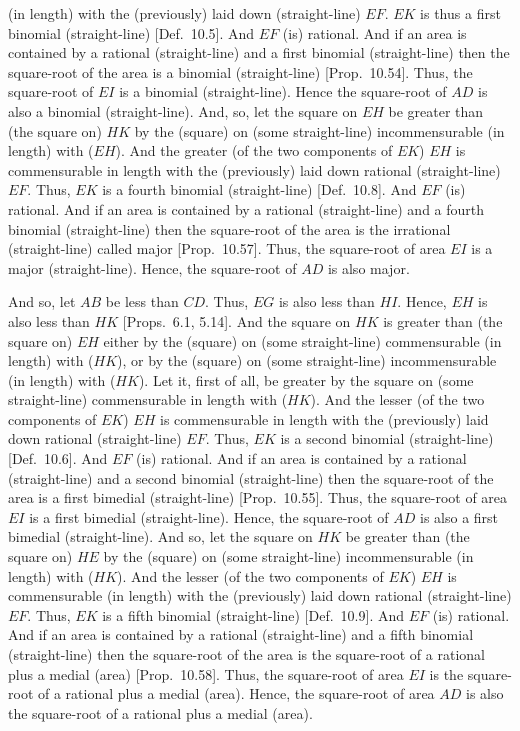 \begin{Parallel}{}{}
{(in length) with the (previously) laid down (straight-line) $EF$. $EK$ is thus a first binomial
(straight-line) [Def.~10.5]. And $EF$ (is) rational. And if an area is contained by a rational (straight-line) and a first
binomial (straight-line) then the square-root  of the  area is a binomial
(straight-line)  [Prop.~10.54]. Thus,
the square-root of $EI$ is a binomial (straight-line). Hence the square-root of $AD$ is also a binomial (straight-line).  And, so, let the
 square on $EH$ be greater than (the square on) $HK$ by the (square) on 
 (some straight-line) incommensurable (in length) with ($EH$). And the
 greater (of the two components of $EK$) $EH$ is commensurable in length with the (previously)
 laid down rational (straight-line) $EF$. Thus, $EK$ is a fourth
 binomial (straight-line) [Def.~10.8]. And
 $EF$ (is) rational. And if an area
 is contained by a rational (straight-line) and a fourth binomial (straight-line) 
 then the square-root of the area is the irrational (straight-line) called
 major [Prop.~10.57]. Thus, the square-root
 of area $EI$ is a major (straight-line). Hence, the square-root of
 $AD$ is also major.

 And so, let $AB$ be less than $CD$. Thus, $EG$ is also less
 than $HI$. Hence, $EH$ is also less than $HK$ [Props.~6.1, 5.14].
 And the square on $HK$ is greater than (the square on) $EH$ either
 by the (square) on (some straight-line) commensurable (in length)
 with ($HK$), or by the (square) on (some straight-line) incommensurable
 (in length) with ($HK$). Let it, first of all, be greater by the square
 on (some straight-line) commensurable in length with ($HK$).
 And the lesser (of the two components of $EK$) $EH$ is  commensurable in length with the
 (previously) laid down rational (straight-line) $EF$. Thus, $EK$
 is a second binomial (straight-line) [Def.~10.6]. 
 And $EF$ (is) rational. And if an area is contained by a rational (straight-line)
 and a second binomial (straight-line)  then the square-root of the area is a
 first bimedial (straight-line) [Prop.~10.55]. 
 Thus, the square-root of area $EI$ is a first bimedial (straight-line).
 Hence, the square-root of $AD$ is also a first bimedial (straight-line).
 And so, let the square on $HK$ be greater than (the square on) $HE$
 by the (square) on (some straight-line) incommensurable (in length) with
 ($HK$). 
 And the lesser (of the two components of $EK$) $EH$ is commensurable (in length) with the (previously) laid down rational (straight-line) $EF$.  Thus, $EK$ is a fifth binomial
 (straight-line) [Def.~10.9]. And $EF$ (is) rational. And if an area is
 contained by a rational (straight-line) and a fifth binomial (straight-line) 
 then the square-root of the area is the square-root of a rational plus
 a medial (area) [Prop.~10.58]. Thus, the square-root of area $EI$ is the square-root of a rational plus a medial (area). Hence,
 the square-root of area $AD$ is also the square-root of a rational plus
 a medial (area).
 
}
\end{Parallel}
